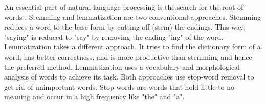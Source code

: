 An essential part of natural language processing is the search for the root of words \cite{buiildChatbotsPython}. 
Stemming and lemmatization are two conventional approaches.
Stemming reduces a word to the base form by cutting off (stem) the endings. 
This way, "saying" is reduced to "say" by removing the ending "ing" of the word.
Lemmatization takes a different approach. 
It tries to find the dictionary form of a word, has better correctness, and is more productive than stemming and hence the preferred method. 
Lemmatization uses a vocabulary and morphological analysis of words to achieve its task.
Both approaches use stop-word removal to get rid of unimportant words.
Stop words are words that hold little to no meaning and occur in a high frequency like "the" and "a".
